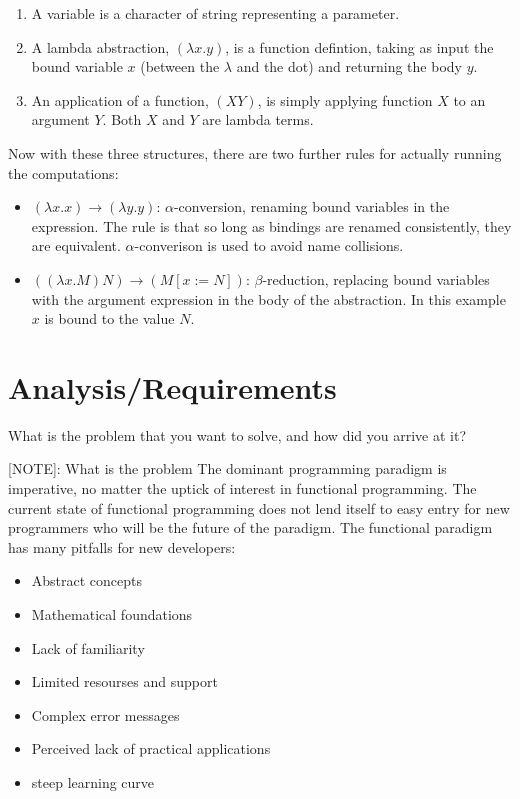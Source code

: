 \documentclass{l4proj}
\begin{document}
\begin{enumerate}
    \item A variable is a character of string representing a parameter. 
    \item A lambda abstraction, $(\lambda x . y)$, is a function defintion, taking as input the bound variable $x$ (between the $\lambda$ and the dot) and returning the body $y$.
    \item An application of a function, $(X Y)$, is simply applying function $X$ to an argument $Y$. Both $X$ and $Y$ are lambda terms.
\end{enumerate}

Now with these three structures, there are two further rules for actually running the computations:
\begin{itemize}
    \item $(\lambda x . x) \rightarrow (\lambda y . y)$: $\alpha$-conversion, renaming bound variables in the expression. The rule is that so long as bindings are renamed consistently, they are equivalent. $\alpha$-converison is used to avoid name collisions.
    \item $((\lambda x . M) N) \rightarrow (M [x := N])$: $\beta$-reduction, replacing bound variables with the argument expression in the body of the abstraction. In this example $x$ is bound to the value $N$.
\end{itemize}


\chapter{Analysis/Requirements}
What is the problem that you want to solve, and how did you arrive at it?

[NOTE]: What is the problem
The dominant programming paradigm is imperative, no matter the uptick of interest in functional programming.
The current state of functional programming does not lend itself to easy entry for new programmers who will be the future of the paradigm.
The functional paradigm has many pitfalls for new developers:
\begin{itemize}
    \item Abstract concepts
    \item Mathematical foundations
    \item Lack of familiarity
    \item Limited resourses and support
    \item Complex error messages
    \item Perceived lack of practical applications
    \item steep learning curve
\end{itemize}
\end{document}
